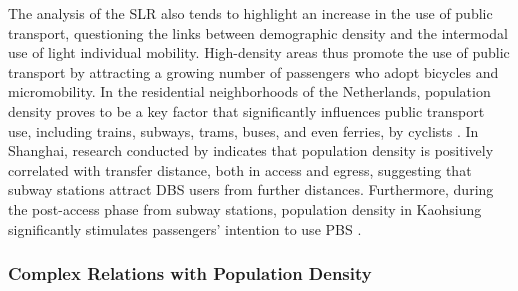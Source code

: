 \begin{refsegment}
The analysis of the \acrshort{SLR} also tends to highlight an increase in the use of public transport, questioning the links between demographic density and the intermodal use of light individual mobility. High-density areas thus promote the use of public transport by attracting a growing number of passengers who adopt bicycles and micromobility. In the residential neighborhoods of the Netherlands, population density proves to be a key factor that significantly influences public transport use, including trains, subways, trams, buses, and even ferries, by cyclists \textcolor{blue}{\autocite[334]{martens_promoting_2007}}. In Shanghai, research conducted by \textcolor{blue}{\textcite[10]{li_exploring_2021}} indicates that population density is positively correlated with transfer distance, both in \gls{access} and \gls{egress}, suggesting that subway stations attract \acrshort{DBS} users from further distances. Furthermore, during the post-access phase from subway stations, population density in Kaohsiung significantly stimulates passengers' intention to use \acrshort{PBS} \textcolor{blue}{\autocite[29]{cheng_expanding_2018}}.%

\subsubsection*{Complex Relations with Population Density
    \label{chap2:relations-complexes-densite-population}
    }


\end{refsegment}
